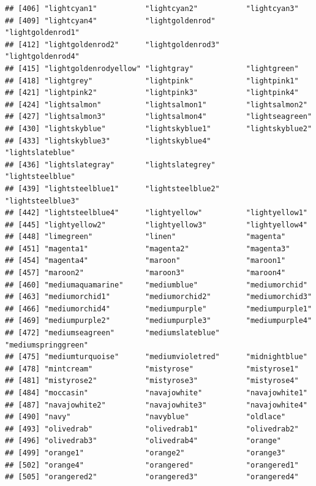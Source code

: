 \documentclass[]{book}
\begin{document}
\begin{verbatim}
## [406] "lightcyan1"           "lightcyan2"           "lightcyan3"          
## [409] "lightcyan4"           "lightgoldenrod"       "lightgoldenrod1"     
## [412] "lightgoldenrod2"      "lightgoldenrod3"      "lightgoldenrod4"     
## [415] "lightgoldenrodyellow" "lightgray"            "lightgreen"          
## [418] "lightgrey"            "lightpink"            "lightpink1"          
## [421] "lightpink2"           "lightpink3"           "lightpink4"          
## [424] "lightsalmon"          "lightsalmon1"         "lightsalmon2"        
## [427] "lightsalmon3"         "lightsalmon4"         "lightseagreen"       
## [430] "lightskyblue"         "lightskyblue1"        "lightskyblue2"       
## [433] "lightskyblue3"        "lightskyblue4"        "lightslateblue"      
## [436] "lightslategray"       "lightslategrey"       "lightsteelblue"      
## [439] "lightsteelblue1"      "lightsteelblue2"      "lightsteelblue3"     
## [442] "lightsteelblue4"      "lightyellow"          "lightyellow1"        
## [445] "lightyellow2"         "lightyellow3"         "lightyellow4"        
## [448] "limegreen"            "linen"                "magenta"             
## [451] "magenta1"             "magenta2"             "magenta3"            
## [454] "magenta4"             "maroon"               "maroon1"             
## [457] "maroon2"              "maroon3"              "maroon4"             
## [460] "mediumaquamarine"     "mediumblue"           "mediumorchid"        
## [463] "mediumorchid1"        "mediumorchid2"        "mediumorchid3"       
## [466] "mediumorchid4"        "mediumpurple"         "mediumpurple1"       
## [469] "mediumpurple2"        "mediumpurple3"        "mediumpurple4"       
## [472] "mediumseagreen"       "mediumslateblue"      "mediumspringgreen"   
## [475] "mediumturquoise"      "mediumvioletred"      "midnightblue"        
## [478] "mintcream"            "mistyrose"            "mistyrose1"          
## [481] "mistyrose2"           "mistyrose3"           "mistyrose4"          
## [484] "moccasin"             "navajowhite"          "navajowhite1"        
## [487] "navajowhite2"         "navajowhite3"         "navajowhite4"        
## [490] "navy"                 "navyblue"             "oldlace"             
## [493] "olivedrab"            "olivedrab1"           "olivedrab2"          
## [496] "olivedrab3"           "olivedrab4"           "orange"              
## [499] "orange1"              "orange2"              "orange3"             
## [502] "orange4"              "orangered"            "orangered1"          
## [505] "orangered2"           "orangered3"           "orangered4"          

\end{verbatim}
\end{document}
